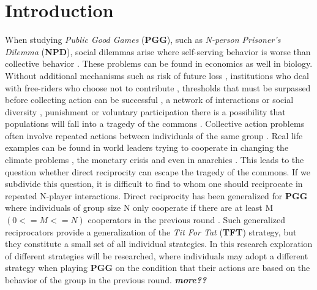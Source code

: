 \documentclass[letterpaper]{article}
\begin{document}
\section{Introduction}
When studying \textit{Public Good Games}  (\textbf{PGG}), such as \textit{N-person Prisoner's Dilemma}  (\textbf{NPD}), social dilemmas arise where self-serving behavior is worse than collective behavior \citep{kollock1998social}. These problems can be found in economics as well in biology.
Without additional mechanisms such as risk of future loss \citep{santos2011risk}, institutions who deal with free-riders who choose not to contribute \citep{vasconcelos2013bottom,sigmund2010social}, thresholds that must be surpassed before collecting action can be successful \citep{pacheco2011evolutionary}, a network of interactions or social diversity \citep{wang2013interdependent,santos2008social}, punishment \citep{fehr2002altruistic,brandt2006punishing} or voluntary participation \citep{hauert2002volunteering} there is a possibility that populations will fall into a tragedy of the commons \citep{hardin1968tragedy}.
Collective action problems often involve repeated actions between individuals of the same group \citep{boyd1988evolution}. Real life examples can be found in world leaders trying to cooperate in changing the climate problems \citep{milinski2008collective,barrett2012climate}, the monetary crisis \citep{jacquet2001economic} and even in anarchies \citep{axelrod1985achieving}. This leads to the question whether direct reciprocity can escape the tragedy of the commons. If we subdivide this question, it is difficult to find to whom one should reciprocate in repeated N-player interactions. Direct reciprocity has been generalized for \textbf{PGG} where individuals of group size N only cooperate if there are at least M $(0<=M<=N)$ cooperators in the previous round \citep{van2012emergence,kurokawa2009emergence}. Such generalized reciprocators provide a generalization of the \textit{Tit For Tat}  (\textbf{TFT}) strategy, but they constitute a small set of all individual strategies.
In this research exploration of different strategies will be researched, where individuals may adopt a different strategy when playing \textbf{PGG} on the condition that their actions are based on the behavior of the group in the previous round.
\textit{\textbf{more??}}
\end{document}
